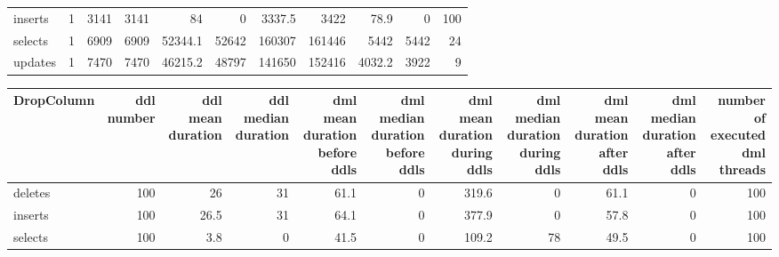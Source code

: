 \begin{tabular}{lrrrrrrrrrr}
 inserts              &            1 &                3141 &                  3141 &                            84   &                                 0 &                          3337.5 &                              3422 &                           78.9 &                                0 &                              100 \\
 selects              &            1 &                6909 &                  6909 &                         52344.1 &                             52642 &                        160307   &                            161446 &                         5442   &                             5442 &                               24 \\
 updates              &            1 &                7470 &                  7470 &                         46215.2 &                             48797 &                        141650   &                            152416 &                         4032.2 &                             3922 &                                9 \\
\hline
\end{tabular}\begin{tabular}{lrrrrrrrrrr}
\hline
 DropColumn   &   ddl number &   ddl mean duration &   ddl median duration &   dml mean duration before ddls &   dml median duration before ddls &   dml mean duration during ddls &   dml median duration during ddls &   dml mean duration after ddls &   dml median duration after ddls &   number of executed dml threads \\
\hline
 deletes      &          100 &                26   &                    31 &                            61.1 &                                 0 &                           319.6 &                                 0 &                           61.1 &                                0 &                              100 \\
 inserts      &          100 &                26.5 &                    31 &                            64.1 &                                 0 &                           377.9 &                                 0 &                           57.8 &                                0 &                              100 \\
 selects      &          100 &                 3.8 &                     0 &                            41.5 &                                 0 &                           109.2 &                                78 &                           49.5 &                                0 &                              100 \\

\end{tabular}
